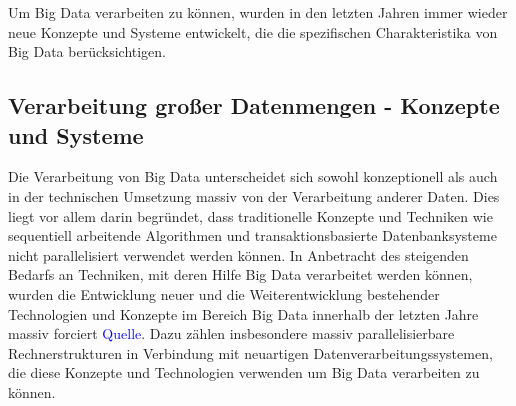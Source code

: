 Um Big Data verarbeiten zu können, wurden in den letzten Jahren immer wieder neue Konzepte und Systeme entwickelt, die die spezifischen Charakteristika von Big Data berücksichtigen.

\subsection{Verarbeitung großer Datenmengen - Konzepte und Systeme}
\label{sec:GrosseDatenmengen}
Die Verarbeitung von Big Data unterscheidet sich sowohl konzeptionell als auch in der technischen Umsetzung massiv von der Verarbeitung anderer Daten. Dies liegt vor allem darin begründet, dass traditionelle Konzepte und Techniken wie sequentiell arbeitende Algorithmen und transaktionsbasierte Datenbanksysteme nicht parallelisiert verwendet werden können. In Anbetracht des steigenden Bedarfs an Techniken, mit deren Hilfe Big Data verarbeitet werden können, wurden die Entwicklung neuer und die Weiterentwicklung bestehender Technologien und Konzepte im Bereich Big Data innerhalb der letzten Jahre massiv forciert \textcolor{blue}{Quelle}. Dazu zählen insbesondere massiv parallelisierbare Rechnerstrukturen in Verbindung mit neuartigen Datenverarbeitungssystemen, die diese Konzepte und Technologien verwenden um Big Data verarbeiten zu können.


